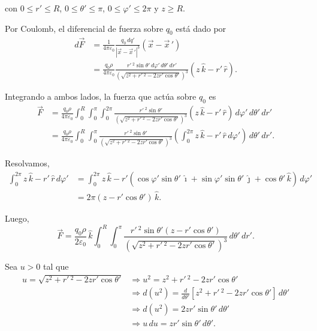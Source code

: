 \begin{ejemplo}
con $0 \leq r' \leq R$, $0 \leq \theta' \leq \pi$, $0 \leq \varphi' \leq 2\pi$ y $z\geq R$.

Por Coulomb, el diferencial de fuerza sobre $q_0$ está dado por
\begin{align*}
    d\Vec{F}&= \frac{1}{4\pi\varepsilon_0} \frac{q_0 \,dq'}{|\Vec{x} - \Vec{x}\,'|^3} (\Vec{x} - \Vec{x}\,') \\
    &= \frac{q_0 \rho}{4\pi \varepsilon_0} \frac{r'\,^2 \sin \theta' \,d \varphi' \,d\theta' \,dr' }{\left(\sqrt{z^2 + r'\,^2 - 2zr' \cos \theta'} \right)^3} (z\,\hat{k} - r' \,\hat{r}).
\end{align*}

Integrando a ambos lados, la fuerza que actúa sobre $q_0$ es
\begin{align*}
    \Vec{F} &= \frac{q_0 \rho}{4\pi \varepsilon_0} \int_0^R \int_0^{\pi} \int_0^{2\pi} \frac{r'\,^2 \sin \theta'  }{\left(\sqrt{z^2 + r'\,^2 - 2zr' \cos \theta'} \right)^3} (z\,\hat{k} - r' \,\hat{r}) \,d \varphi' \,d\theta' \,dr' \\
    &= \frac{q_0 \rho}{4\pi \varepsilon_0} \int_0^R \int_0^{\pi}  \frac{r'\,^2 \sin \theta'  }{\left(\sqrt{z^2 + r'\,^2 - 2zr' \cos \theta'} \right)^3} \left(\int_0^{2\pi} z\,\hat{k} - r' \,\hat{r} \,d \varphi' \right)\,d\theta' \,dr'.
\end{align*}

Resolvamos,
\begin{align*}
    \int_0^{2\pi} z \, \hat{k} - r' \,\hat{r}  \,d\varphi' &= \int_0^{2\pi} z \,\hat{k} - r'(\cos\varphi' \sin\theta' \, \hat{\imath} + \sin\varphi' \sin\theta' \, \hat{\jmath} + \cos\theta' \, \hat{k}) \,d\varphi' \\
    &= 2\pi (z-r'\cos\theta') \, \hat{k}.
\end{align*}

Luego,
$$\vec{F} =  \frac{ q_0 \rho}{2 \varepsilon_0} \, \hat{k} \int_0^R \int_0^{\pi} \frac{r'\,^2 \sin \theta' (z-r' \cos \theta')}{\left( \sqrt{z^2 + r'\,^2 -2zr' \cos \theta'} \right)^3} \,d\theta' \,dr'.$$

Sea $u > 0$ tal que
\begin{align*}
     u = \sqrt{z^2 + r'\,^2 - 2zr' \cos\theta'} & \Rightarrow  u^2 = z^2 + r'\,^2 - 2zr' \cos\theta' \\
     &\Rightarrow d(u^2) = \frac{d}{d \theta'} [z^2 + r'\,^2 - 2zr' \cos\theta' ] \,d\theta' \\
 & \Rightarrow  d(u^2) = 2zr' \sin \theta'\, d\theta' \\
 & \Rightarrow  u\,du = z r' \sin \theta'\, d\theta'.
\end{align*}


\end{ejemplo}
